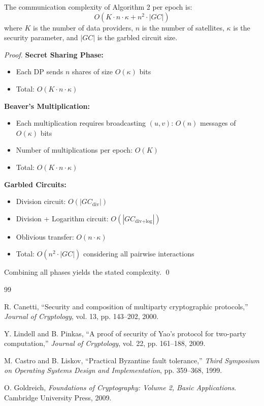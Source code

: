 \begin{theorem}
\label{thm:complexity}
The communication complexity of Algorithm 2 per epoch is:
\begin{equation}
O(K \cdot n \cdot \kappa + n^2 \cdot |GC|)
\end{equation}
where $K$ is the number of data providers, $n$ is the number of satellites, $\kappa$ is the security parameter, and $|GC|$ is the garbled circuit size.
\end{theorem}

\begin{proof}
\textbf{Secret Sharing Phase:}
\begin{itemize}
    \item Each DP sends $n$ shares of size $O(\kappa)$ bits
    \item Total: $O(K \cdot n \cdot \kappa)$
\end{itemize}

\textbf{Beaver's Multiplication:}
\begin{itemize}
    \item Each multiplication requires broadcasting $(u, v)$: $O(n)$ messages of $O(\kappa)$ bits
    \item Number of multiplications per epoch: $O(K)$
    \item Total: $O(K \cdot n \cdot \kappa)$
\end{itemize}

\textbf{Garbled Circuits:}
\begin{itemize}
    \item Division circuit: $O(|GC_{\text{div}}|)$ 
    \item Division + Logarithm circuit: $O(|GC_{\text{div+log}}|)$
    \item Oblivious transfer: $O(n \cdot \kappa)$
    \item Total: $O(n^2 \cdot |GC|)$ considering all pairwise interactions
\end{itemize}

Combining all phases yields the stated complexity. \qed
\end{proof}


\begin{thebibliography}{99}

R. Canetti, ``Security and composition of multiparty cryptographic protocols,'' \textit{Journal of Cryptology}, vol. 13, pp. 143--202, 2000.

Y. Lindell and B. Pinkas, ``A proof of security of Yao's protocol for two-party computation,'' \textit{Journal of Cryptology}, vol. 22, pp. 161--188, 2009.

M. Castro and B. Liskov, ``Practical Byzantine fault tolerance,'' \textit{Third Symposium on Operating Systems Design and Implementation}, pp. 359--368, 1999.

O. Goldreich, \textit{Foundations of Cryptography: Volume 2, Basic Applications}. Cambridge University Press, 2009.

\end{thebibliography}
